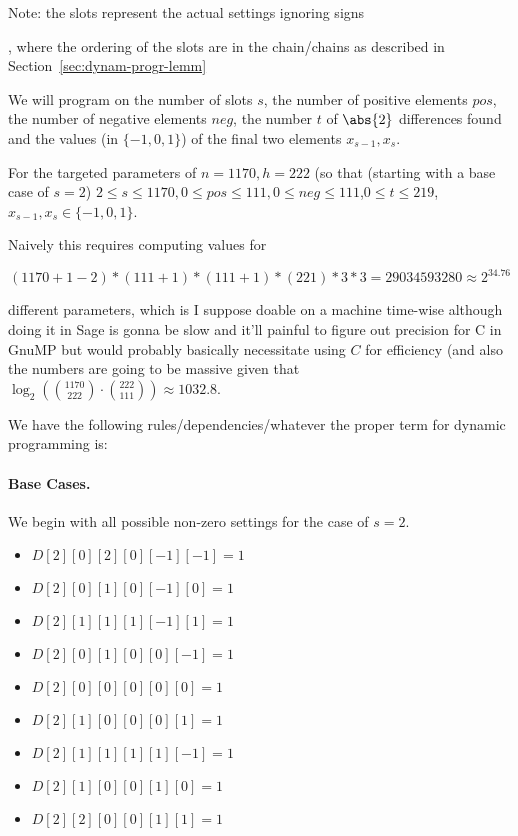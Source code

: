 Note: the slots represent the actual settings ignoring signs 

, where the ordering of the slots are in the chain/chains as
described in Section~\ref{sec:dynam-progr-lemm}


We will program on the number of slots $s$, the number of positive
elements $pos$, the number of negative elements $neg$, the number $t$ of
$\abs{2}$ differences found and the values (in $\{-1,0,1\}$) of the
final two elements $x_{s-1},x_{s}$.

For the targeted parameters of  $n=1170,h=222$ (so
that (starting with a base case of $s=2$) 
$2\leq s \leq 1170, 0\leq pos\leq 111, 0\leq neg \leq 111$,$0\leq t \leq
219$, $x_{s-1},x_{s} \in \{-1,0,1\}$. 

Naively this requires computing values for 

\[(1170+1-2)*(111+1)*(111+1)*(221)*3*3=29034593280\approx 2^{34.76}\]

different parameters, which is I suppose doable on a machine time-wise
although doing it in Sage is gonna be slow and it'll painful to figure
out precision for C in GnuMP 
but would probably basically necessitate using $C$ for efficiency (and
also the numbers are going to be massive given that
$\log_{2}(\binom{1170}{222}\cdot \binom{222}{111})\approx 1032.8$. 


We have the following rules/dependencies/whatever the proper term
for dynamic programming is:

\paragraph{Base Cases.} We begin with all possible non-zero settings
for the case of $s=2$.
\begin{itemize}
\item $D[2][0][2][0][-1][-1]=1$
\item $D[2][0][1][0][-1][0]=1$
\item $D[2][1][1][1][-1][1]=1$
\item $D[2][0][1][0][0][-1]=1$
\item $D[2][0][0][0][0][0]=1$
\item $D[2][1][0][0][0][1]=1$
\item $D[2][1][1][1][1][-1]=1$
\item $D[2][1][0][0][1][0]=1$
\item $D[2][2][0][0][1][1]=1$
\end{itemize}

